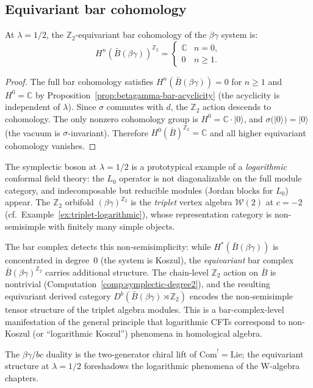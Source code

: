 \subsection{Equivariant bar cohomology}

\begin{proposition}
\label{prop:symplectic-equivariant-cohomology}
At $\lambda = 1/2$, the $\mathbb{Z}_2$-equivariant bar
cohomology of the $\beta\gamma$ system is:
\begin{equation}\label{eq:equivariant-cohomology}
H^n(\bar{B}(\beta\gamma))^{\mathbb{Z}_2}
= \begin{cases}
\mathbb{C} & n = 0, \\
0 & n \geq 1.
\end{cases}
\end{equation}
\end{proposition}

\begin{proof}
The full bar cohomology satisfies $H^n(\bar{B}(\beta\gamma)) = 0$
for $n \geq 1$ and $H^0 = \mathbb{C}$ by
Proposition~\ref{prop:betagamma-bar-acyclicity}
(the acyclicity is independent of $\lambda$).  Since $\sigma$
commutes with $d$, the $\mathbb{Z}_2$ action descends to
cohomology.  The only nonzero cohomology group is
$H^0 = \mathbb{C} \cdot |0\rangle$, and $\sigma(|0\rangle) =
|0\rangle$ (the vacuum is $\sigma$-invariant).  Therefore
$H^0(\bar{B})^{\mathbb{Z}_2} = \mathbb{C}$ and all higher
equivariant cohomology vanishes.
\end{proof}

\begin{remark}
\label{rem:symplectic-logarithmic}
The symplectic boson at $\lambda = 1/2$ is a prototypical example
of a \emph{logarithmic} conformal field theory: the $L_0$ operator
is not diagonalizable on the full module category, and indecomposable
but reducible modules (Jordan blocks for $L_0$) appear.  The
$\mathbb{Z}_2$ orbifold $(\beta\gamma)^{\mathbb{Z}_2}$ is the
\emph{triplet} vertex algebra $\mathcal{W}(2)$ at $c = -2$
(cf.\ Example~\ref{ex:triplet-logarithmic}), whose representation
category is non-semisimple with finitely many simple objects.

The bar complex detects this non-semisimplicity: while
$H^*(\bar{B}(\beta\gamma))$ is concentrated in degree~$0$ (the system
is Koszul), the \emph{equivariant} bar complex
$\bar{B}(\beta\gamma)^{\mathbb{Z}_2}$ carries additional structure.
The chain-level $\mathbb{Z}_2$ action on $\bar{B}$ is nontrivial
(Computation~\ref{comp:symplectic-degree2}), and the resulting
equivariant derived category $D^b(\bar{B}(\beta\gamma)
\rtimes \mathbb{Z}_2)$ encodes the non-semisimple tensor structure
of the triplet algebra modules.  This is a bar-complex-level
manifestation of the general principle that logarithmic CFTs
correspond to non-Koszul (or ``logarithmic Koszul'') phenomena in
homological algebra.
\end{remark}

The $\beta\gamma/bc$ duality is the two-generator chiral lift of $\mathrm{Com}^! = \mathrm{Lie}$; the equivariant structure at $\lambda = 1/2$ foreshadows the logarithmic phenomena of the W-algebra chapters.
